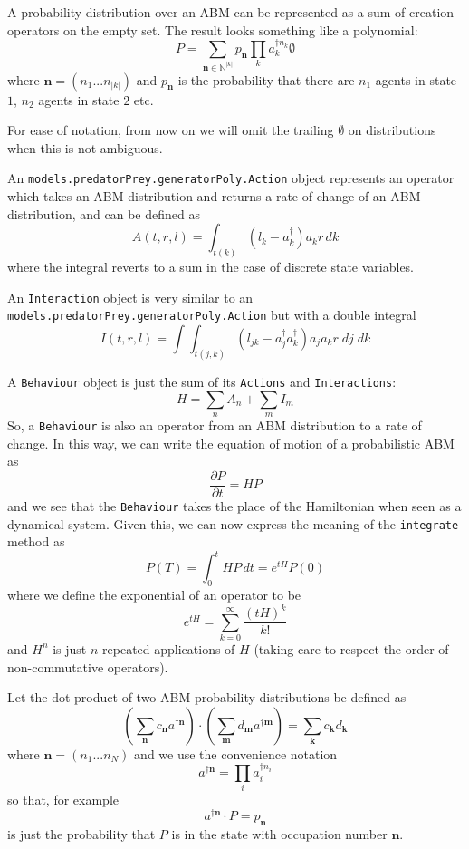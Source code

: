 \documentclass[letterpaper,twocolumn,10pt]{article}
\begin{document}
A probability distribution over an ABM can be represented as a sum of creation operators on the empty set. The result looks something like a polynomial:
\[
P = \sum_{\mathbf{n}\in \mathbb{N}^{|k|}} p_\mathbf{n} \prod_k a_k^{\dag n_k}\emptyset
\]
where $\mathbf{n} = (n_1...n_{|k|})$ and $p_\mathbf{n}$ is the probability that there are $n_1$ agents in state $1$, $n_2$ agents in state $2$ etc.

For ease of notation, from now on we will omit the trailing $\emptyset$ on distributions when this is not ambiguous.


An \texttt{models.predatorPrey.generatorPoly.Action} object represents an operator which takes an ABM distribution and returns a rate of change of an ABM distribution, and can be defined as
\[
A(t,r,l) = \int_{t(k)} (l_k - a_k^\dag)a_kr \,dk
\] 
where the integral reverts to a sum in the case of discrete state variables.

An \texttt{Interaction} object is very similar to an \texttt{models.predatorPrey.generatorPoly.Action} but with a double integral
\[
I(t,r,l) = \int \int_{t(j,k)} (l_{jk} - a_j^\dag a_k^\dag)a_j a_k r\;  dj\; dk
\] 

A \texttt{Behaviour} object is just the sum of its \texttt{Actions} and \texttt{Interactions}:
\[
H = \sum_n A_n + \sum_m I_m
\]
So, a \texttt{Behaviour} is also an operator from an ABM distribution to a rate of change. In this way, we can write the equation of motion of a probabilistic ABM as
\[
\frac{\partial P}{\partial t} = HP
\]
and we see that the \texttt{Behaviour} takes the place of the Hamiltonian when seen as a dynamical system. Given this, we can now express the meaning of the \texttt{integrate} method as
\begin{equation}
P(T) = \int_0^t HP \, dt = e^{tH}P(0)
\label{mastereq}
\end{equation}
where we define the exponential of an operator to be
\[
e^{tH} = \sum_{k=0}^\infty \frac{(tH)^k}{k!}
\]
and $H^n$ is just $n$ repeated applications of $H$ (taking care to respect the order of non-commutative operators).

Let the dot product of two ABM probability distributions be defined as
\[
\left(\sum_\mathbf{n} c_\mathbf{n} a^{\dag \mathbf{n}}\right) \cdot \left(\sum_\mathbf{m} d_\mathbf{m} a^{\dag \mathbf{m}}\right) = \sum_\mathbf{k} c_\mathbf{k}d_\mathbf{k}
\]
where $\mathbf{n} = (n_1...n_N)$ and we use the convenience notation
\[
a^{\dag \mathbf{n}} = \prod_i a_i^{\dag n_i}
\]
so that, for example
\[
a^{\dag \mathbf{n}} \cdot P = p_\mathbf{n}
\]
is just the probability that $P$ is in the state with occupation number $\mathbf{n}$.
\end{document}
